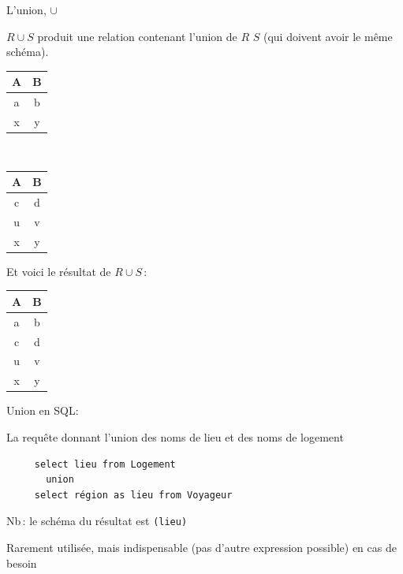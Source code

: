 \begin{frame}[fragile]{L'union, $\cup$}

$R \cup S$ produit 
une relation contenant l'union de $R$ $S$ (qui doivent avoir le même schéma).

\vfill

\begin{minipage}[t]{6cm}
\begin{center}
\begin{tabular}{c|c}
A & B \\ \hline
a & b  \\
x & y  \\\hline 
\end{tabular}
\end{center}
\end{minipage} \
\begin{minipage}[t]{6cm}
\begin{center}
\begin{tabular}{c|c}
A & B\\ \hline
c & d  \\ 
u & v  \\
x & y  \\\hline 
\end{tabular}
\end{center}
\end{minipage} 

\vfill


Et voici le résultat de $R \cup S$\,:

\begin{center}
\begin{tabular}{c|c}
A & B\\ \hline
a & b  \\
c & d  \\ 
u & v  \\
x & y  \\\hline 
\end{tabular}
\end{center}

\end{frame}


\begin{frame}[fragile]{Union en SQL: }


La requête donnant l'union des noms de lieu et des noms de logement
\
\vfill

\begin{verbatim}
     select lieu from Logement
       union
     select région as lieu from Voyageur
\end{verbatim}

\vfill

Nb\,: le schéma du résultat est \texttt{(lieu)}

\vfill

\begin{blocgauche}
Rarement utilisée, mais indispensable (pas d'autre expression possible)
en cas de besoin
\end{blocgauche}

\end{frame}



